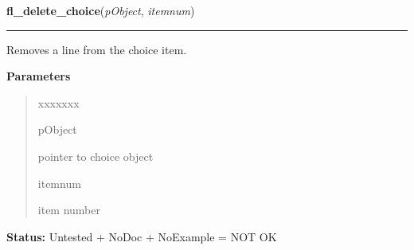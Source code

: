 \hspace{.8\funcindent}\begin{boxedminipage}{\funcwidth}

    \raggedright \textbf{fl\_delete\_choice}(\textit{pObject}, \textit{itemnum})

    \vspace{-1.5ex}

    \rule{\textwidth}{0.5\fboxrule}
\setlength{\parskip}{2ex}
    Removes a line from the choice item.

\setlength{\parskip}{1ex}
      \textbf{Parameters}
      \vspace{-1ex}

      \begin{quote}
        \begin{Ventry}{xxxxxxx}

          \item[pObject]

          pointer to choice object

          \item[itemnum]

          item number

        \end{Ventry}

      \end{quote}

\textbf{Status:} Untested + NoDoc + NoExample = NOT OK



    \end{boxedminipage}

    \label{xformslib:library:fl_set_choice}

    \vspace{0.5ex}

